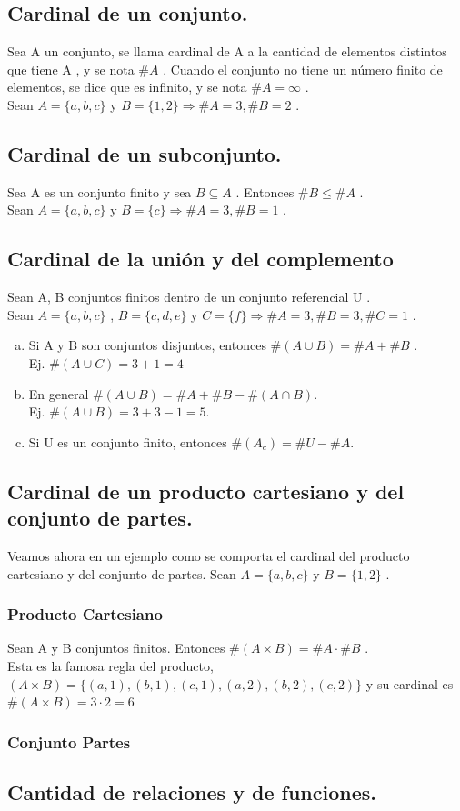 \documentclass[14pt]{book}
\begin{document}
\subsection{Cardinal de un conjunto.}
Sea A un conjunto, se llama cardinal de A a la cantidad de elementos
distintos que tiene A , y se nota $\#A$ . Cuando el conjunto no tiene un
número finito de elementos, se dice que es infinito, y se nota $\#A = \infty$ . \\
 	Sean $A = \{a, b, c\}$ y $B = \{1, 2\} \Rightarrow \#A = 3, \#B = 2$ .
\subsection{Cardinal de un subconjunto.}
Sea A es un conjunto finito y sea $B \subseteq A$ . Entonces $\#B \leq \#A$ . \\
 	Sean $A = \{a, b, c\}$ y $B = \{c\} \Rightarrow \#A = 3, \#B = 1$ .
\subsection{Cardinal de la unión y del complemento}Sean A, B conjuntos finitos dentro de un conjunto referencial U . \\ 
 	Sean $A = \{a, b, c\}$ , $B = \{c,d,e \rbrace$ y $C = \{f\} \Rightarrow \#A = 3, \#B = 3,\#C = 1$ .
\begin{enumerate}[a)]
	\item Si A y B son conjuntos disjuntos, entonces $\#(A \cup B) = \#A + \#B$ . \\
		Ej.	$ \#(A \cup C) = 3+1=4 $
	\item En general $ \#(A \cup B) = \#A + \#B - \#(A \cap B)$. \\
			Ej.	$   \#(A \cup B) = 3 + 3 - 1 = 5. $		
	\item Si U es un conjunto finito, entonces $\#(A_c ) = \#U - \#A $.
\end{enumerate}


\subsection{Cardinal de un producto cartesiano y del conjunto de partes.}
Veamos ahora en un ejemplo como se comporta el cardinal del producto
cartesiano y del conjunto de partes. Sean $ A = \{a, b, c\}$ y $B = \{1, 2\} $ .
\subsubsection{Producto Cartesiano}
Sean A y B conjuntos finitos. Entonces $ \#(A \times B) = \#A \cdot \#B $ .\\
Esta es la famosa regla del producto, $ (A \times B) = \{(a,1),(b,1),(c,1),(a,2),(b,2),(c,2) \}$ y su cardinal es $ \#(A \times B) = 3\cdot 2 = 6$
\subsubsection{Conjunto Partes}


\subsection{Cantidad de relaciones y de funciones.}




%

\end{document}
